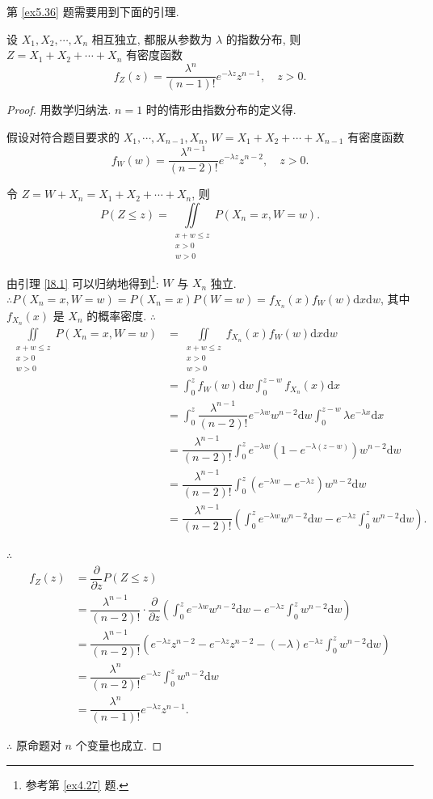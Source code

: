 \documentclass[color=black,device=normal,lang=cn]{elegantnote}
\numberwithin{equation}{section}
\theoremstyle{plain}
\numberwithin{exercise}{exsection}
\begin{document}
第 \ref{ex5.36} 题需要用到下面的引理.
\begin{lemma}\label{l10.1}
    设 $X_1,X_2,\cdots,X_n$ 相互独立, 都服从参数为 $\lambda$ 的指数分布, 则 $Z=X_1+X_2+\cdots+X_n$ 有密度函数
    \[f_Z(z)=\dfrac{\lambda^n}{(n-1)!}e^{-\lambda z}z^{n-1},\quad z>0.\]
\end{lemma}
\begin{proof}
    用数学归纳法. $n=1$ 时的情形由指数分布的定义得.
    
    假设对符合题目要求的 $X_1,\cdots,X_{n-1},X_n$, $W=X_1+X_2+\cdots+X_{n-1}$ 有密度函数
    \[f_W(w)=\dfrac{\lambda^{n-1}}{(n-2)!}e^{-\lambda z}z^{n-2},\quad z>0.\]

    令 $Z=W+X_n=X_1+X_2+\cdots+X_n$, 则
    \[P(Z\leq z)=\iint\limits_{\substack{x+w\leq z\\x>0\\w>0}}P(X_n=x,W=w).\]

    由引理 \ref{l8.1} 可以归纳地得到\footnote{参考第 \ref{ex4.27} 题.}: $W$ 与 $X_n$ 独立. $\therefore P(X_n=x,W=w)=P(X_n=x)P(W=w)=f_{X_n}(x)f_W(w)\mathrm{d}x\mathrm{d}w$, 其中 $f_{X_n}(x)$ 是 $X_n$ 的概率密度. $\therefore$
    \begin{align*}
        \iint\limits_{\substack{x+w\leq z\\x>0\\w>0}}P(X_n=x,W=w) & =\iint\limits_{\substack{x+w\leq z\\x>0\\w>0}}f_{X_n}(x)f_W(w)\mathrm{d}x\mathrm{d}w \\
        & =\int_0^zf_W(w)\mathrm{d}w\int_0^{z-w}f_{X_n}(x)\mathrm{d}x \\
        & =\int_0^z\dfrac{\lambda^{n-1}}{(n-2)!}e^{-\lambda w}w^{n-2}\mathrm{d}w\int_0^{z-w}\lambda e^{-\lambda x}\mathrm{d}x \\
        & =\dfrac{\lambda^{n-1}}{(n-2)!}\int_0^ze^{-\lambda w}(1-e^{-\lambda(z-w)})w^{n-2}\mathrm{d}w \\
        & =\dfrac{\lambda^{n-1}}{(n-2)!}\int_0^z(e^{-\lambda w}-e^{-\lambda z})w^{n-2}\mathrm{d}w \\
        & =\dfrac{\lambda^{n-1}}{(n-2)!}\left(\int_0^ze^{-\lambda w}w^{n-2}\mathrm{d}w-e^{-\lambda z}\int_0^zw^{n-2}\mathrm{d}w\right).
    \end{align*}

    $\therefore$
    \begin{align*}
        f_Z(z) & =\dfrac{\partial}{\partial z}P(Z\leq z) \\
        & =\dfrac{\lambda^{n-1}}{(n-2)!}\cdot\dfrac{\partial}{\partial z}\left(\int_0^ze^{-\lambda w}w^{n-2}\mathrm{d}w-e^{-\lambda z}\int_0^zw^{n-2}\mathrm{d}w\right) \\
        & =\dfrac{\lambda^{n-1}}{(n-2)!}\left(e^{-\lambda z}z^{n-2}-e^{-\lambda z}z^{n-2}-(-\lambda)e^{-\lambda z}\int_0^zw^{n-2}\mathrm{d}w\right) \\
        & =\dfrac{\lambda^n}{(n-2)!}e^{-\lambda z}\int_0^zw^{n-2}\mathrm{d}w \\
        & =\dfrac{\lambda^n}{(n-1)!}e^{-\lambda z}z^{n-1}.
    \end{align*}

    $\therefore$ 原命题对 $n$ 个变量也成立.
\end{proof}
\end{document}
